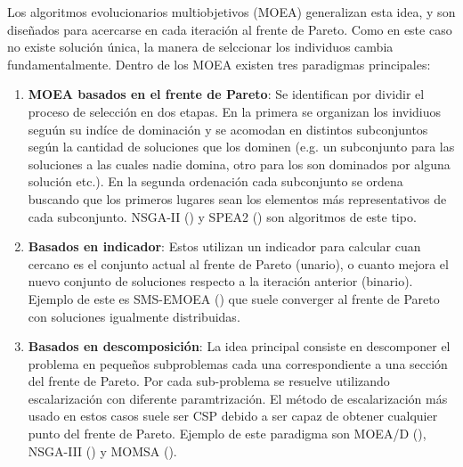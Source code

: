 Los algoritmos evolucionarios multiobjetivos (MOEA) generalizan esta idea, y son diseñados para acercarse en cada iteraci\'on  al frente de Pareto. Como en este caso no existe soluci\'on \'unica, la manera de selccionar los individuos cambia fundamentalmente. Dentro de los MOEA existen tres paradigmas principales:

\begin{enumerate}
    \item \textbf{MOEA basados en el frente de Pareto}\label{background:def:MOEA}: Se identifican por dividir el proceso de selecci\'on en dos etapas. En la primera se organizan los invidiuos segu\'un su ind\'ice de dominaci\'on y se acomodan en distintos subconjuntos seg\'un la cantidad de soluciones que los dominen (e.g. un subconjunto para las soluciones a las cuales nadie domina, otro para los son dominados por alguna soluci\'on etc.). En la segunda ordenaci\'on cada subconjunto se ordena buscando que los primeros lugares sean los elementos m\'as representativos de cada subconjunto. NSGA-II (\cite{deb2002fast}) y SPEA2 (\cite{zitzler1999multiobjective}) son algoritmos de este tipo.

    \item \textbf{Basados en indicador}: Estos utilizan un indicador para calcular cuan cercano es el conjunto actual al frente de Pareto (unario), o cuanto mejora el nuevo conjunto de soluciones respecto a la iteraci\'on anterior (binario). Ejemplo de este es SMS-EMOEA (\cite{emmerich2005emo}) que suele converger al frente de Pareto con soluciones igualmente distribuidas.

    \item \textbf{Basados en descomposici\'on}: La idea principal consiste en descomponer el problema en pequeños subproblemas cada una correspondiente a una secci\'on del frente de Pareto. Por cada sub-problema se resuelve utilizando escalarizaci\'on con diferente paramtrizaci\'on. El m\'etodo de escalarizaci\'on m\'as usado en estos casos suele ser CSP debido a ser capaz de obtener cualquier punto del frente de Pareto. Ejemplo de este paradigma son MOEA/D (\cite{zhang2007moea}), NSGA-III (\cite{deb2013evolutionary}) y MOMSA (\cite{sharifi2021new}).

\end{enumerate}

